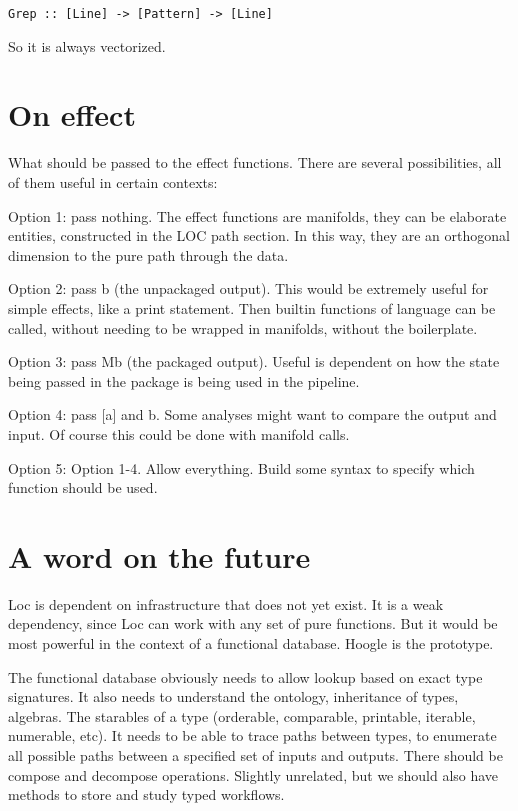 \documentclass[12pt]{article}
\begin{document}
\begin{verbatim}
Grep :: [Line] -> [Pattern] -> [Line]
\end{verbatim}

So it is always vectorized.

\section{On effect}

What should be passed to the effect functions. There are several possibilities,
all of them useful in certain contexts:

Option 1: pass nothing. The effect functions are manifolds, they can be
elaborate entities, constructed in the LOC path section. In this way, they are
an orthogonal dimension to the pure path through the data.

Option 2: pass b (the unpackaged output). This would be extremely useful for
simple effects, like a print statement. Then builtin functions of language can
be called, without needing to be wrapped in manifolds, without the boilerplate.

Option 3: pass Mb (the packaged output). Useful is dependent on how the state
being passed in the package is being used in the pipeline.

Option 4: pass [a] and b. Some analyses might want to compare the output and
input. Of course this could be done with manifold calls.

Option 5: Option 1-4. Allow everything. Build some syntax to specify which
function should be used.

\section{A word on the future}

Loc is dependent on infrastructure that does not yet exist. It is a weak
dependency, since Loc can work with any set of pure functions. But it would be
most powerful in the context of a functional database. Hoogle is the prototype.

The functional database obviously needs to allow lookup based on exact type
signatures. It also needs to understand the ontology, inheritance of types,
algebras. The starables of a type (orderable, comparable, printable, iterable,
numerable, etc). It needs to be able to trace paths between types, to enumerate
all possible paths between a specified set of inputs and outputs. There should
be compose and decompose operations. Slightly unrelated, but we should also
have methods to store and study typed workflows.
\end{document}
